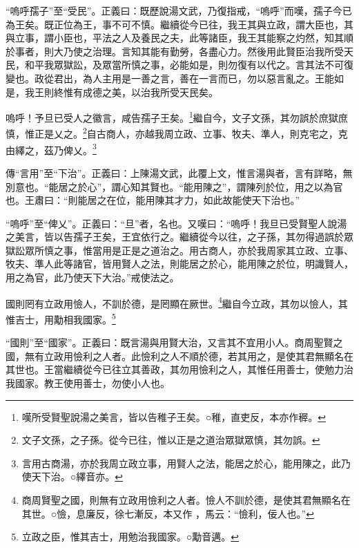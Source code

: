 {\noindent\shu{}\fzkt “嗚呼孺子”至“受民”。正義曰：既歷說湯文武，乃復指戒，“嗚呼”而嘆，孺子今已為王矣。既正位為王，事不可不慎。繼續從今已往，我王其與立政，謂大臣也，其與立事，謂小臣也，平法之人及養民之夫，此等諸臣，我王其能察之灼然，知其順於事者，則大乃使之治理。言知其能有勤勞，各盡心力。然後用此賢臣治我所受天民，和平我眾獄訟，及眾當所慎之事，必能如是，則勿復有以代之。言其法不可復變也。政從君出，為人主用是一善之言，善在一言而已，勿以惡言亂之。王能如是，我王則終惟有成德之美，以治我所受天民矣。 \par}

嗚呼！予旦已受人之徽言，咸告孺子王矣。\footnote{嘆所受賢聖說湯之美言，皆以告稚子王矣。○稚，直吏反，本亦作稺。}繼自今，文子文孫，其勿誤於庶獄庶慎，惟正是乂之。\footnote{文子文孫，之子孫。從今已往，惟以正是之道治眾獄眾慎，其勿誤。}自古商人，亦越我周立政、立事、牧夫、準人，則克宅之，克由繹之，茲乃俾乂。\footnote{言用古商湯，亦於我周立政立事，用賢人之法，能居之於心，能用陳之，此乃使天下治。○繹音亦。}


{\noindent\zhuan{}\fzbyks 傳“言用”至“下治”。正義曰：上陳湯文武，此覆上文，惟言湯與者，言有詳略，無別意也。“能居之於心”，謂心知其賢也。“能用陳之”，謂陳列於位，用之以為官也。王肅曰：“則能居之在位，能用陳其才力，如此故能使天下治也。” \par}

{\noindent\shu{}\fzkt “嗚呼”至“俾乂”。正義曰：“旦”者，名也。又嘆曰：“嗚呼！我旦已受賢聖人說湯之美言，皆以告孺子王矣，王宜依行之。繼續從今以往，之子孫，其勿得過誤於眾獄訟眾所慎之事，惟當用是正是之道治之。用古商人，亦於我周家其立政、立事、牧夫、準人此等諸官，皆用賢人之法，則能居之於心，能用陳之於位，明識賢人，用之為官，此乃使天下大治。”戒使法之。 \par}

國則罔有立政用憸人，不訓於德，是罔顯在厥世。\footnote{商周賢聖之國，則無有立政用憸利之人者。憸人不訓於德，是使其君無顯名在其世。○憸，息廉反，徐七漸反，本又作 ，馬云：“憸利，佞人也。”}繼自今立政，其勿以憸人，其惟吉士，用勱相我國家。\footnote{立政之臣，惟其吉士，用勉治我國家。○勱音邁。}

{\noindent\shu{}\fzkt “國則”至“國家”。正義曰：既言湯與用賢大治，又言其不宜用小人。商周聖賢之國，無有立政用憸利之人者。此憸利之人不順於德，若其用之，是使其君無顯名在其世也。王當繼續從今已往立其善政，其勿用憸利之人，其惟任用善士，使勉力治我國家。教王使用善士，勿使小人也。 \par}

